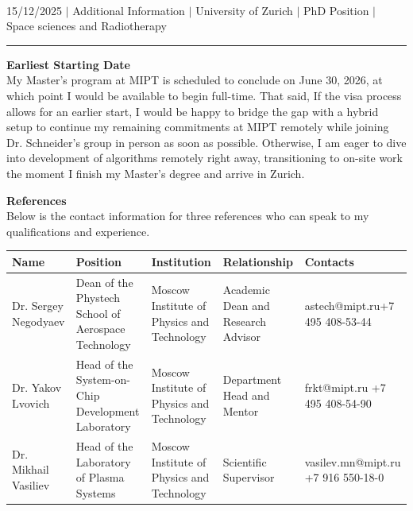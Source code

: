 \documentclass[a4paper,12pt]{article}
\begin{document}
\begin{center}
    {\Huge \scshape {\fontsize{25}{30}\selectfont{Reza}} {\fontsize{25}{30}}} \\ \vspace{3pt}
    {\small {15/12/2025}} $|$
    {\small {Additional Information}} $|$
    {\small {University of Zurich}} $|$
    {\small {PhD Position}} $|$
    {\small {Space sciences and Radiotherapy}}
    \vspace{-10pt}
\end{center}
\vspace{-10pt}
\noindent\rule{\textwidth}{0.5pt}

\vspace{10pt}

\textbf{Earliest Starting Date}\\
My Master's program at MIPT is scheduled to conclude on June 30, 2026, at which point I would be available to begin full-time. That said, If the visa process allows for an earlier start, I would be happy to bridge the gap with a hybrid setup to continue my remaining commitments at MIPT remotely while joining Dr. Schneider's group in person as soon as possible. Otherwise, I am eager to dive into development of algorithms remotely right away, transitioning to on-site work the moment I finish my Master's degree and arrive in Zurich.

\vspace{20pt}

\textbf{References}\\
Below is the contact information for three references who can speak to my qualifications and experience.

\vspace{10pt}

\small
\centering
{\renewcommand{\arraystretch}{2}%
\begin{tabularx}{\textwidth}{@{}YYYYY@{}}
\toprule
\textbf{Name} & \textbf{Position} & \textbf{Institution} & \textbf{Relationship} & \textbf{Contacts} \\
\midrule
Dr. Sergey Negodyaev & Dean of the Phystech School of Aerospace Technology & Moscow Institute of Physics and Technology & Academic Dean and Research Advisor & astech@mipt.ru\newline +7 495 408-53-44 \\

Dr. Yakov Lvovich &  Head of the System-on-Chip Development Laboratory & Moscow Institute of Physics and Technology & Department Head and Mentor & frkt@mipt.ru \newline +7 495 408-54-90 \\

Dr. Mikhail Vasiliev & Head of the Laboratory of Plasma Systems & Moscow Institute of Physics and Technology & Scientific Supervisor & vasilev.mn@mipt.ru \newline +7 916 550-18-0 \\
\bottomrule
\end{tabularx}}
\end{document}
